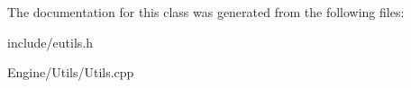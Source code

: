 The documentation for this class was generated from the following files\+:\begin{DoxyCompactItemize}
\item 
include/eutils.\+h\item 
Engine/\+Utils/Utils.\+cpp\end{DoxyCompactItemize}
